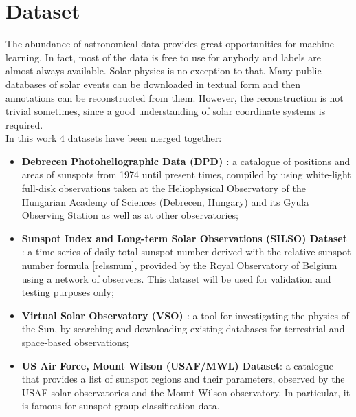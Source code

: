 \chapter{Dataset}
\label{capitolo6}
\thispagestyle{empty}
\noindent The abundance of astronomical data provides great opportunities for machine learning. In fact, most of the data is free to use for anybody and labels are almost always available. Solar physics is no exception to that. Many public databases of solar events can be downloaded in textual form and then annotations can be reconstructed from them. However, the reconstruction is not trivial sometimes, since a good understanding of solar coordinate systems is required.\\
In this work 4 datasets have been merged together:
\begin{itemize}
  \item \textbf{Debrecen Photoheliographic Data (DPD) \cite{baranyi2016line}\cite{gyHori2016comparative}}: a catalogue of positions and areas of sunspots from 1974 until present times, compiled by using white-light full-disk observations taken at the Heliophysical Observatory of the Hungarian Academy of Sciences (Debrecen, Hungary) and its Gyula Observing Station as well as at other observatories;
  \item \textbf{Sunspot Index and Long-term Solar Observations (SILSO) Dataset \cite{clette2014revisiting}}: a time series of daily total sunspot number derived with the relative sunspot number formula \eqref{relssnum}, provided by the Royal Observatory of Belgium using a network of observers. This dataset will be used for validation and testing purposes only;
  \item \textbf{Virtual Solar Observatory (VSO) \cite{hill2009virtual}}: a tool for investigating the physics of the Sun, by searching and downloading existing databases for terrestrial and space-based observations;
  \item \textbf{US Air Force, Mount Wilson (USAF/MWL) Dataset}: a catalogue that provides a list of sunspot regions and their parameters, observed by the USAF solar observatories and the Mount Wilson observatory. In particular, it is famous for sunspot group classification data.
\end{itemize}
